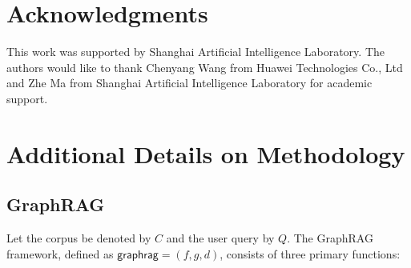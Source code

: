 \documentclass[11pt]{article}
\begin{document}
\section*{Acknowledgments}
This work was supported by Shanghai Artificial Intelligence Laboratory. The authors would like to thank Chenyang Wang from Huawei Technologies Co., Ltd and Zhe Ma from Shanghai Artificial Intelligence Laboratory for academic support.










\clearpage
\appendix

\section{Additional Details on Methodology}
\label{sec:A}
\subsection{GraphRAG}
\label{sec:A.1}
 
Let the corpus be denoted by $C$ and the user query by $Q$. The GraphRAG framework, defined as $\mathsf{graphrag} = (f, g, d)$, consists of three primary functions:
\end{document}
